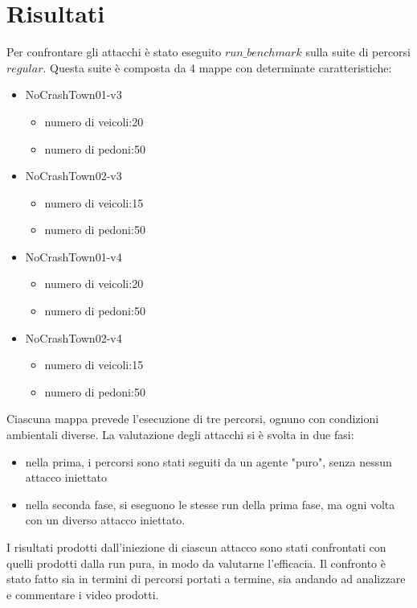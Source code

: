 \section{Risultati}
Per confrontare gli attacchi è stato eseguito $run\_benchmark$ sulla suite di percorsi $regular$.
Questa suite è composta da 4 mappe con determinate caratteristiche:\begin{itemize}
    \item NoCrashTown01-v3\begin{itemize}
        \item numero di veicoli:20
        \item numero di pedoni:50
    \end{itemize}
    \item NoCrashTown02-v3 \begin{itemize}
        \item numero di veicoli:15
        \item numero di pedoni:50
    \end{itemize}
    \item NoCrashTown01-v4 \begin{itemize}
        \item numero di veicoli:20
        \item numero di pedoni:50
    \end{itemize}
    \item NoCrashTown02-v4 \begin{itemize}
        \item numero di veicoli:15
        \item numero di pedoni:50
    \end{itemize}
\end{itemize}
Ciascuna mappa prevede l'esecuzione di tre percorsi, ognuno con  condizioni ambientali diverse. 
La valutazione degli attacchi si è svolta in due fasi:\begin{itemize}
    \item nella prima, i percorsi sono stati seguiti da un agente "puro", senza nessun attacco iniettato
    \item nella seconda fase, si eseguono le stesse run della prima fase, ma ogni volta con un diverso attacco iniettato.
\end{itemize}
I risultati prodotti dall'iniezione di ciascun attacco sono stati confrontati con quelli prodotti dalla run pura, in modo da valutarne l'efficacia.
Il confronto  è stato fatto sia in termini di percorsi portati a termine, sia andando ad analizzare e commentare i video prodotti.
